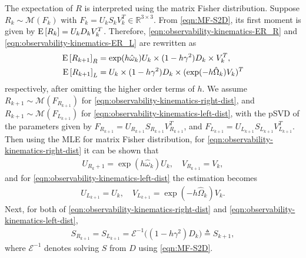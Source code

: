 The expectation of $R$ is interpreted using the matrix Fisher distribution.
Suppose $R_k \sim \mathcal{M}(F_k)$ with $F_k = U_k S_k V_k^T\in\mathbb{R}^{3\times 3}$.
From \eqref{eqn:MF-S2D}, its first moment is given by $\mathrm{E}\left[ R_k \right] = U_k D_k V_k^T$.
Therefore, \eqref{eqn:observability-kinematics-ER_R} and \eqref{eqn:observability-kinematics-ER_L} are rewritten as 
\begin{align*}
	\mathrm{E}\left[ R_{k+1} \right]_R &= \exp(h\hat\omega_k) U_k \times (1-h\gamma^2)D_k \times V_k^T, \\
	\mathrm{E}\left[ R_{k+1} \right]_L &= U_k \times (1-h\gamma^2)D_k \times (\exp(-h\hat{\Omega}_k)V_k)^T
\end{align*}
respectively, after omitting the higher order terms of $h$.
We assume $R_{k+1} \sim \mathcal{M}(F_{R_{k+1}})$ for \eqref{eqn:observability-kinematics-right-dist}, and $R_{k+1} \sim \mathcal{M}(F_{L_{k+1}})$ for \eqref{eqn:observability-kinematics-left-dist}, with the pSVD of the parameters given by $F_{R_{k+1}} = U_{R_{k+1}}S_{R_{k+1}}V_{R_{k+1}}^T$, and $F_{L_{k+1}} = U_{L_{k+1}}S_{L_{k+1}}V_{L_{k+1}}^T$.
Then using the MLE for matrix Fisher distribution, for \eqref{eqn:observability-kinematics-right-dist} it can be shown that
\begin{align} \label{eqn:observability-kinematics-UV_R}
	U_{R_k+1} = \exp(h\hat{\omega}_k)U_k, \quad V_{R_{k+1}} = V_k,
\end{align}
and for \eqref{eqn:observability-kinematics-left-dist} the estimation becomes
\begin{align}
	U_{L_{k+1}} = U_k, \quad V_{L_{k+1}} = \exp(-h\hat{\Omega}_k)V_k.
\end{align}
Next, for both of \eqref{eqn:observability-kinematics-right-dist} and \eqref{eqn:observability-kinematics-left-dist},
\begin{align} \label{eqn:observability-kinematics-S}
	S_{R_{k+1}} = S_{L_{k+1}} = \mathcal{E}^{-1}\big((1-h\gamma^2)D_k\big) \triangleq S_{k+1},
\end{align}
where $\mathcal{E}^{-1}$ denotes solving $S$ from $D$ using \eqref{eqn:MF-S2D}.

